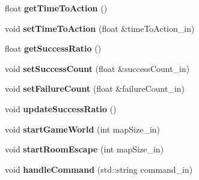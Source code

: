 \begin{DoxyCompactItemize}
float {\bfseries get\+Time\+To\+Action} ()
\item 
\mbox{\label{class_game_logic_a61d9598ddfa5dae86cd698a955e232f0}} 
void {\bfseries set\+Time\+To\+Action} (float \&time\+To\+Action\+\_\+in)
\item 
\mbox{\label{class_game_logic_ae71b196ec29a773c6d3f6e64c5338405}} 
float {\bfseries get\+Success\+Ratio} ()
\item 
\mbox{\label{class_game_logic_a73ca60d0295b7c13c3df2a895117d68a}} 
void {\bfseries set\+Success\+Count} (float \&success\+Count\+\_\+in)
\item 
\mbox{\label{class_game_logic_a4b24bf56e92696d94a08ae291b338f3b}} 
void {\bfseries set\+Failure\+Count} (float \&failure\+Count\+\_\+in)
\item 
\mbox{\label{class_game_logic_acdba7637438df999e891677fb4ca1635}} 
void {\bfseries update\+Success\+Ratio} ()
\item 
\mbox{\label{class_game_logic_acb1f1e43ae0144f68979684f5e2de873}} 
void {\bfseries start\+Game\+World} (int map\+Size\+\_\+in)
\item 
\mbox{\label{class_game_logic_a86c4e6445ea6e820dbbe630fd207175c}} 
void {\bfseries start\+Room\+Escape} (int map\+Size\+\_\+in)
\item 
\mbox{\label{class_game_logic_a010837988f5ceb0c95f2e021b36217b2}} 
void {\bfseries handle\+Command} (std\+::string command\+\_\+in)
\end{DoxyCompactItemize}
